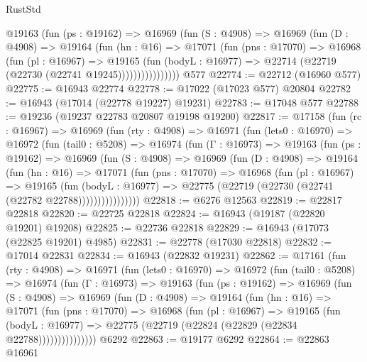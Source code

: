 \begin{lexlean}{RustStd}
\begin{coremodule}
              @19163
                (fun (ps : @19162) =>
                @16969
                  (fun (S : @4908) =>
                  @16969
                    (fun (D : @4908) =>
                    @19164
                      (fun (hn : @16) =>
                      @17071
                        (fun (pns : @17070) =>
                        @16968
                          (fun (pl : @16967) =>
                          @19165
                            (fun (bodyL : @16977) =>
                            @22714 (@22719 (@22730 (@22741 @19245))))))))))))))))
    @577
@22774 := @22712 (@16960 @577)
@22775 := @16943 @22774
@22778 := @17022 (@17023 @577) @20804
@22782 := @16943 (@17014 (@22778 @19227) @19231)
@22783 := @17048 @577
@22788 := @19236 (@19237 @22783 @20807 @19198 @19200)
@22817 := @17158
    (fun (rc : @16967) =>
    @16969
      (fun (rty : @4908) =>
      @16971
        (fun (lets0 : @16970) =>
        @16972
          (fun (tail0 : @5208) =>
          @16974
            (fun (Γ : @16973) =>
            @19163
              (fun (ps : @19162) =>
              @16969
                (fun (S : @4908) =>
                @16969
                  (fun (D : @4908) =>
                  @19164
                    (fun (hn : @16) =>
                    @17071
                      (fun (pns : @17070) =>
                      @16968
                        (fun (pl : @16967) =>
                        @19165
                          (fun (bodyL : @16977) =>
                          @22775 (@22719 (@22730 (@22741 (@22782 @22788))))))))))))))))
@22818 := @6276 @12563
@22819 := @22817 @22818
@22820 := @22725 @22818
@22824 := @16943 (@19187 (@22820 @19201) @19208)
@22825 := @22736 @22818
@22829 := @16943 (@17073 (@22825 @19201) @4985)
@22831 := @22778 (@17030 @22818)
@22832 := @17014 @22831
@22834 := @16943 (@22832 @19231)
@22862 := @17161
    (fun (rty : @4908) =>
    @16971
      (fun (lets0 : @16970) =>
      @16972
        (fun (tail0 : @5208) =>
        @16974
          (fun (Γ : @16973) =>
          @19163
            (fun (ps : @19162) =>
            @16969
              (fun (S : @4908) =>
              @16969
                (fun (D : @4908) =>
                @19164
                  (fun (hn : @16) =>
                  @17071
                    (fun (pns : @17070) =>
                    @16968
                      (fun (pl : @16967) =>
                      @19165
                        (fun (bodyL : @16977) =>
                        @22775 (@22719 (@22824 (@22829 (@22834 @22788)))))))))))))))
    @6292
@22863 := @19177 @6292
@22864 := @22863 @16961

\end{coremodule}
\end{lexlean}
